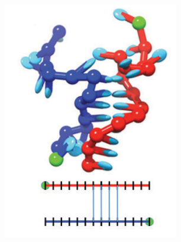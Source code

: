 \begin{figure}[ht]
\begin{centering}
\begin{subfigure}[t]{\dimexpr.2\linewidth-1.3em\relax}
  \includegraphics[width=1.1\linewidth,valign=t]{Figures/hybridDiag3.png}
  \end{subfigure}
  \hspace{-0.21cm}
  \begin{subfigure}[t]{\dimexpr.2\linewidth-1.3em\relax}
  \centering

\end{subfigure}
\end{centering}
\end{figure}
